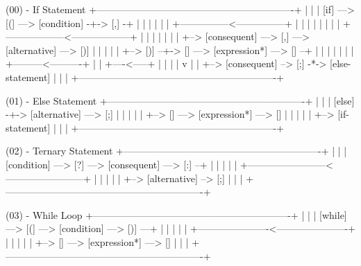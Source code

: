 {(00) - If Statement
+-------------------------------------------------------------+
|                                                             |
|   [if] ---> [(] ---> [condition] -+-> [,] -+                |
|                                   |        |                |
|   +---------------<---------------+        |                |
|   |                                        |                |
|   |  +------------------<------------------+                |
|   |  |                                                      |
|   |  +--> [consequent] ---> [,] ---> [alternative] ---> [)] |
|   |                                                         |
|   +--> [)] --+-> [{] ---> [expression*] ---> [}] --+        |
|              |                                     |        |
|              |                +---------<----------+        |
|   +----<-----+                |                             |
|   |                           v                             |
|   +--> [consequent] --> [;] -{*}-> [else-statement]         |
|                                                             |
+-------------------------------------------------------------+


(01) - Else Statement
+-------------------------------------------------------------+
|                                                             |
|   [else] -+-> [alternative] ---> [;]                        |
|           |                                                 |
|           +--> [{] ---> [expression*] ---> [}]              |
|           |                                                 |
|           +--> [if-statement]                               |
|                                                             |
+-------------------------------------------------------------+


(02) - Ternary Statement
+-------------------------------------------------------------+
|                                                             |
|   [condition] ---> [?] ---> [consequent] ---> [:] --+       |
|                                                     |       |
|   +------------------------<------------------------+       |
|   |                                                         |
|   +--> [alternative] --> [;]                                |
|                                                             |
+-------------------------------------------------------------+


(03) - While Loop
+-------------------------------------------------------------+
|                                                             |
|   [while] ---> [(] ---> [condition] ---> [)] ---+           |
|                                                 |           |
|   +----------------------<----------------------+           |
|   |                                                         |
|   +--> [{] ---> [expression*] ---> [}]                      |
|                                                             |
+-------------------------------------------------------------+


}
